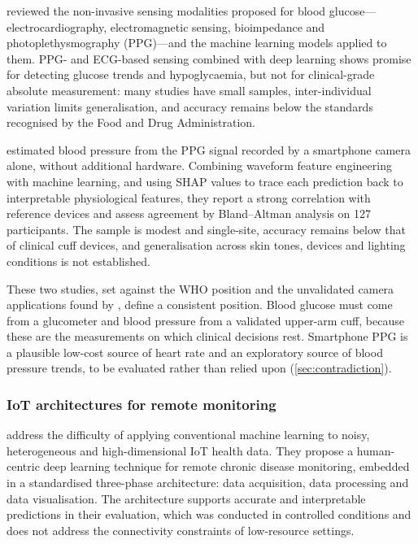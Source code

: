 \Textcite{alhaddad2022} reviewed the non-invasive sensing modalities proposed for blood glucose---electrocardiography, electromagnetic sensing, bioimpedance and photoplethysmography (PPG)---and the machine learning models applied to them. PPG- and ECG-based sensing combined with deep learning shows promise for detecting glucose trends and hypoglycaemia, but not for clinical-grade absolute measurement: many studies have small samples, inter-individual variation limits generalisation, and accuracy remains below the standards recognised by the Food and Drug Administration.

\Textcite{liu2025ppg} estimated blood pressure from the PPG signal recorded by a smartphone camera alone, without additional hardware. Combining waveform feature engineering with machine learning, and using SHAP values to trace each prediction back to interpretable physiological features, they report a strong correlation with reference devices and assess agreement by Bland--Altman analysis on 127 participants. The sample is modest and single-site, accuracy remains below that of clinical cuff devices, and generalisation across skin tones, devices and lighting conditions is not established.

These two studies, set against the WHO position and the unvalidated camera applications found by \textcite{alessa2019}, define a consistent position. Blood glucose must come from a glucometer and blood pressure from a validated upper-arm cuff, because these are the measurements on which clinical decisions rest. Smartphone PPG is a plausible low-cost source of heart rate and an exploratory source of blood pressure trends, to be evaluated rather than relied upon (\cref{sec:contradiction}).

\subsubsection{IoT architectures for remote monitoring}

\Textcite{tai2024} address the difficulty of applying conventional machine learning to noisy, heterogeneous and high-dimensional IoT health data. They propose a human-centric deep learning technique for remote chronic disease monitoring, embedded in a standardised three-phase architecture: data acquisition, data processing and data visualisation. The architecture supports accurate and interpretable predictions in their evaluation, which was conducted in controlled conditions and does not address the connectivity constraints of low-resource settings.

